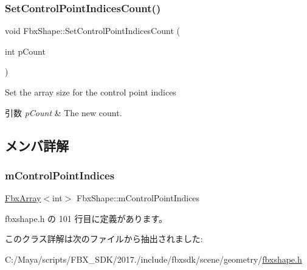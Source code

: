 \subsubsection{\texorpdfstring{Set\+Control\+Point\+Indices\+Count()}{SetControlPointIndicesCount()}}
{\footnotesize\ttfamily void Fbx\+Shape\+::\+Set\+Control\+Point\+Indices\+Count (\begin{DoxyParamCaption}\item[{int}]{p\+Count }\end{DoxyParamCaption})}

Set the array size for the control point indices 
\begin{DoxyParams}{引数}
{\em p\+Count} & The new count. \\
\hline
\end{DoxyParams}


\subsection{メンバ詳解}
\mbox{\label{class_fbx_shape_ae27b2ace894858d90213f44ebe3f23a1}} 
\subsubsection{\texorpdfstring{m\+Control\+Point\+Indices}{mControlPointIndices}}
{\footnotesize\ttfamily \hyperlink{class_fbx_array}{Fbx\+Array}$<$int$>$ Fbx\+Shape\+::m\+Control\+Point\+Indices\hspace{0.3cm}{\ttfamily [protected]}}



 fbxshape.\+h の 101 行目に定義があります。



このクラス詳解は次のファイルから抽出されました\+:\begin{DoxyCompactItemize}
\item 
C\+:/\+Maya/scripts/\+F\+B\+X\+\_\+\+S\+D\+K/2017./include/fbxsdk/scene/geometry/\hyperlink{fbxshape_8h}{fbxshape.\+h}\end{DoxyCompactItemize}
